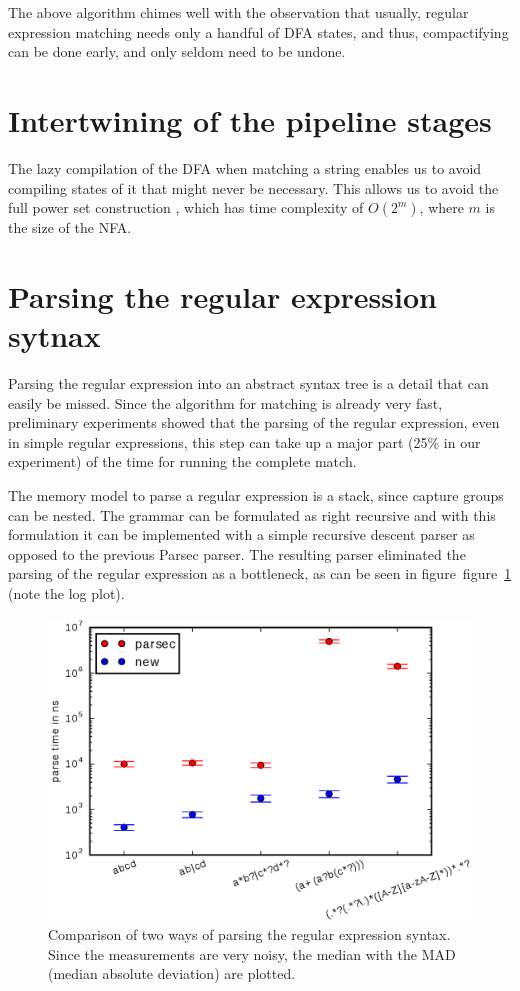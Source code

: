 \documentclass[11pt]{Thesis}
\theoremstyle{definition}
\newcommand{\Figref}[1]{figure~\ref{fig:#1}}
\newcommand{\figlabel}[1]{\label{fig:#1}}
\newcommand{\seclabel}[1]{\label{sec:#1}}
\begin{document}
The above algorithm chimes well with the observation that usually,
regular expression matching needs only a handful of DFA states, and thus,
compactifying can be done early, and only seldom need to be undone.

\section{Intertwining of the pipeline stages}
The lazy compilation of the DFA when matching a string enables us
to avoid compiling states of it that might never be necessary. This
allows us to avoid the full power set construction \cite{Sips05a}, which has 
time complexity of $O(2^m)$, where $m$ is the size of the NFA.

\section{Parsing the regular expression sytnax}  \seclabel{regex-syntax}
Parsing the regular expression into an abstract syntax tree is a detail that
can easily be missed. Since the algorithm for matching is already very fast,
preliminary experiments showed that the parsing of the regular expression, even
in simple regular expressions, this step can take up a major part (25\% in our
experiment) of the time for running the complete match.

The memory model to parse a regular expression is a stack, since capture groups
can be nested. The grammar can be formulated as right recursive and with this
formulation it can be implemented with a simple recursive descent parser as 
opposed to the previous Parsec parser. The resulting parser eliminated the 
parsing of the regular expression as a bottleneck, as can be seen in
figure~\Figref{regex-syntax-parsing} (note the log plot).

\begin{figure}
  \includegraphics[width=\linewidth]{graphs/logplot-parserspeed-robust}

  \caption[Regular expression grammar parse time]{\figlabel{regex-syntax-parsing}Comparison of two ways of parsing the
regular expression syntax. Since the measurements are very noisy, the median 
with the MAD (median absolute deviation) are plotted.}
\end{figure}
\end{document}
